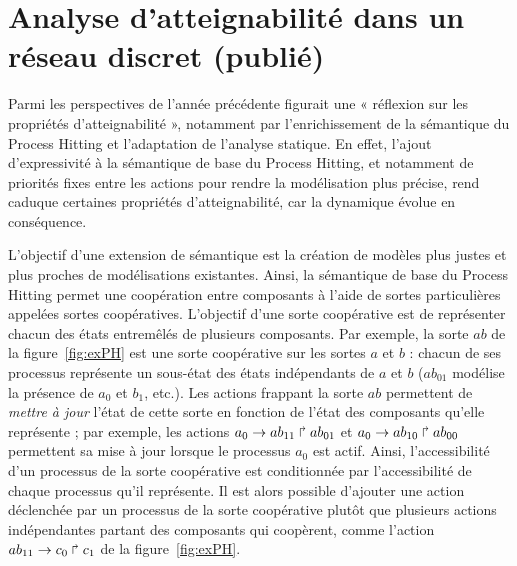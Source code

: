 \section{Analyse d'atteignabilité dans un réseau discret \normalsize(publié)}
\label{sec:cs2bio}

Parmi les perspectives de l'année précédente figurait une « réflexion sur les propriétés d'atteignabilité », notamment par l'enrichissement de la sémantique du Process Hitting et l'adaptation de l'analyse statique.
En effet, l'ajout d'expressivité à la sémantique de base du Process Hitting, et notamment de priorités fixes entre les actions pour rendre la modélisation plus précise, rend caduque certaines propriétés d'atteignabilité, car la dynamique évolue en conséquence.

L'objectif d'une extension de sémantique est la création de modèles plus justes et plus proches de modélisations existantes.
Ainsi, la sémantique de base du Process Hitting permet une coopération entre composants à l'aide de sortes particulières appelées sortes coopératives.
L'objectif d'une sorte coopérative est de représenter chacun des états entremêlés de plusieurs composants.
Par exemple, la sorte $ab$ de la figure~\ref{fig:exPH} est une sorte coopérative sur les sortes $a$ et $b$ : chacun de ses processus représente un sous-état des états indépendants de $a$ et $b$ ($ab_{01}$ modélise la présence de $a_0$ et $b_1$, etc.).
Les actions frappant la sorte $ab$ permettent de \emph{mettre à jour} l'état de cette sorte en fonction de l'état des composants qu'elle représente ;
par exemple, les actions $a_0\rightarrow ab_{11}\Rsh ab_{01}$ et $a_0\rightarrow ab_{10}\Rsh ab_{00}$ permettent sa mise à jour lorsque le processus $a_0$ est actif.
Ainsi, l'accessibilité d'un processus de la sorte coopérative est conditionnée par l'accessibilité de chaque processus qu'il représente.
Il est alors possible d'ajouter une action déclenchée par un processus de la sorte coopérative plutôt que plusieurs actions indépendantes partant des composants qui coopèrent, comme l'action $ab_{11}\rightarrow c_0\Rsh c_1$ de la figure~\ref{fig:exPH}.

